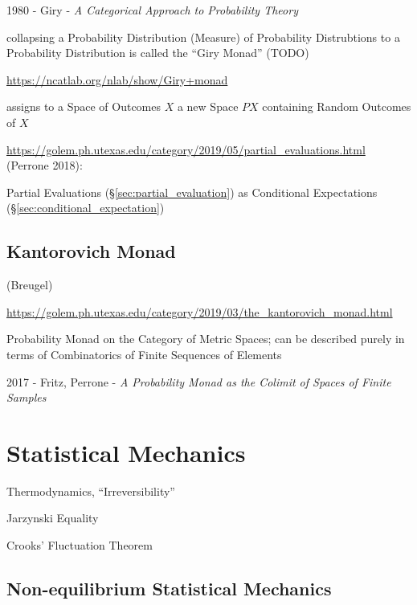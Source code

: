 1980 - Giry - \emph{A Categorical Approach to Probability Theory}

collapsing a Probability Distribution (Measure) of Probability Distrubtions to a
Probability Distribution is called the ``Giry Monad'' (TODO)

\url{https://ncatlab.org/nlab/show/Giry+monad}

assigns to a Space of Outcomes $X$ a new Space $P X$ containing Random Outcomes
of $X$

\url{https://golem.ph.utexas.edu/category/2019/05/partial_evaluations.html}
(Perrone 2018):

Partial Evaluations (\S\ref{sec:partial_evaluation}) as Conditional Expectations
(\S\ref{sec:conditional_expectation})



\subsection{Kantorovich Monad}\label{sec:kantorovich_monad}

(Breugel)

\url{https://golem.ph.utexas.edu/category/2019/03/the_kantorovich_monad.html}

Probability Monad on the Category of Metric Spaces; can be described purely in
terms of Combinatorics of Finite Sequences of Elements

2017 - Fritz, Perrone - \emph{A Probability Monad as the Colimit of Spaces of
  Finite Samples}



\section{Statistical Mechanics}\label{sec:statistical_mechanics}

Thermodynamics, ``Irreversibility''

Jarzynski Equality

Crooks' Fluctuation Theorem



\subsection{Non-equilibrium Statistical Mechanics}
\label{sec:nonequilibrium_statistical_mechanics}

